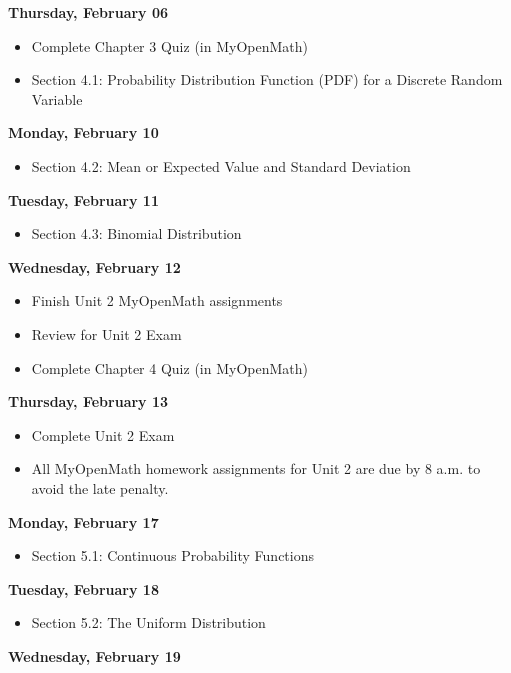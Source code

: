 \documentclass[11pt]{article}
\begin{document}
\textbf{Thursday, February 06}

\begin{itemize}
\item Complete Chapter 3 Quiz (in MyOpenMath)
\item Section 4.1: Probability Distribution Function (PDF) for a Discrete Random Variable
\end{itemize}

\textbf{Monday, February 10}

\begin{itemize}
\item Section 4.2: Mean or Expected Value and Standard Deviation
\end{itemize}

\textbf{Tuesday, February 11}

\begin{itemize}
\item Section 4.3: Binomial Distribution
\end{itemize}

\textbf{Wednesday, February 12}

\begin{itemize}
\item Finish Unit 2 MyOpenMath assignments
\item Review for Unit 2 Exam
\item Complete Chapter 4 Quiz (in MyOpenMath)
\end{itemize}

\textbf{Thursday, February 13}

\begin{itemize}
\item Complete Unit 2 Exam
\item All MyOpenMath homework assignments for Unit 2 are due by 8 a.m. to avoid the late penalty.
\end{itemize}

\textbf{Monday, February 17}

\begin{itemize}
\item Section 5.1: Continuous Probability Functions
\end{itemize}

\textbf{Tuesday, February 18}

\begin{itemize}
\item Section 5.2: The Uniform Distribution
\end{itemize}

\textbf{Wednesday, February 19}
\end{document}
